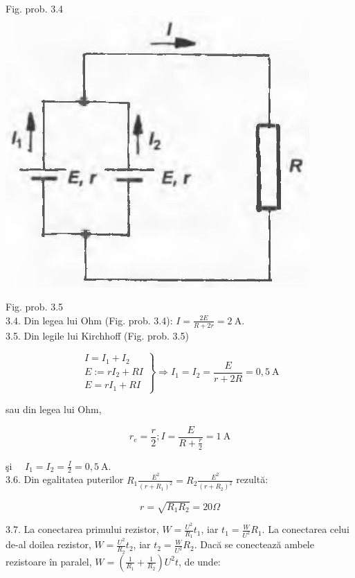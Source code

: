 \documentclass[10pt]{article}
\begin{document}
Fig. prob. 3.4\\
\includegraphics[max width=\textwidth, center]{2025_07_01_5b3ff9fa0d508c8e9f17g-341}

Fig. prob. 3.5\\
3.4. Din legea lui Ohm (Fig. prob. 3.4): $I=\frac{2 E}{R+2 r}=2 \mathrm{~A}$.\\
3.5. Din legile lui Kirchhoff (Fig. prob. 3.5)

$$
\left.\begin{array}{l}
I=I_{1}+I_{2} \\
E:=r I_{2}+R I \\
E=r I_{1}+R I
\end{array}\right\} \Rightarrow I_{1}=I_{2}=\frac{E}{r+2 R}=0,5 \mathrm{~A}
$$

sau din legea lui Ohm,

$$
r_{e}=\frac{r}{2} ; I=\frac{E}{R+\frac{r}{2}}=1 \mathrm{~A}
$$

şi $\quad I_{1}=I_{2}=\frac{I}{2}=0,5 \mathrm{~A}$.\\
3.6. Din egalitatea puterilor $R_{1} \frac{E^{2}}{\left(r+R_{1}\right)^{2}}=R_{2} \frac{E^{2}}{\left(r+R_{2}\right)^{2}}$ rezultă:

$$
r=\sqrt{R_{1} R_{2}}=20 \Omega
$$

3.7. La conectarea primului rezistor, $W=\frac{U^{2}}{R_{1}} t_{1}$, iar $t_{1}=\frac{W}{U^{2}} R_{1}$. La conectarea celui de-al doilea rezistor, $W=\frac{U^{2}}{R_{2}} t_{2}$, iar $t_{2}=\frac{W}{U^{2}} R_{2}$. Dacă se conectează ambele rezistoare în paralel, $W=\left(\frac{1}{R_{1}}+\frac{1}{R_{2}}\right) U^{2} t$, de unde:
\end{document}

